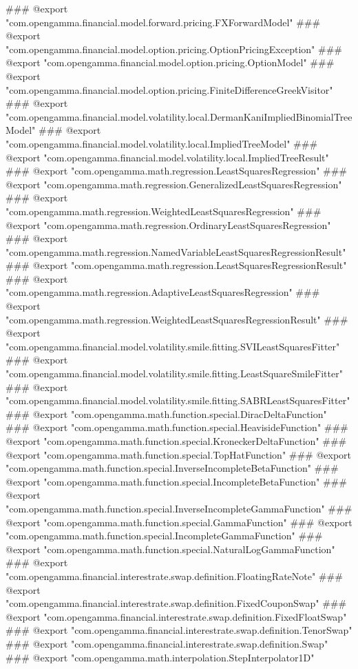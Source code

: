 ### @export "com.opengamma.financial.model.forward.pricing.FXForwardModel"
### @export "com.opengamma.financial.model.option.pricing.OptionPricingException"
### @export "com.opengamma.financial.model.option.pricing.OptionModel"
### @export "com.opengamma.financial.model.option.pricing.FiniteDifferenceGreekVisitor"
### @export "com.opengamma.financial.model.volatility.local.DermanKaniImpliedBinomialTreeModel"
### @export "com.opengamma.financial.model.volatility.local.ImpliedTreeModel"
### @export "com.opengamma.financial.model.volatility.local.ImpliedTreeResult"
### @export "com.opengamma.math.regression.LeastSquaresRegression"
### @export "com.opengamma.math.regression.GeneralizedLeastSquaresRegression"
### @export "com.opengamma.math.regression.WeightedLeastSquaresRegression"
### @export "com.opengamma.math.regression.OrdinaryLeastSquaresRegression"
### @export "com.opengamma.math.regression.NamedVariableLeastSquaresRegressionResult"
### @export "com.opengamma.math.regression.LeastSquaresRegressionResult"
### @export "com.opengamma.math.regression.AdaptiveLeastSquaresRegression"
### @export "com.opengamma.math.regression.WeightedLeastSquaresRegressionResult"
### @export "com.opengamma.financial.model.volatility.smile.fitting.SVILeastSquaresFitter"
### @export "com.opengamma.financial.model.volatility.smile.fitting.LeastSquareSmileFitter"
### @export "com.opengamma.financial.model.volatility.smile.fitting.SABRLeastSquaresFitter"
### @export "com.opengamma.math.function.special.DiracDeltaFunction"
### @export "com.opengamma.math.function.special.HeavisideFunction"
### @export "com.opengamma.math.function.special.KroneckerDeltaFunction"
### @export "com.opengamma.math.function.special.TopHatFunction"
### @export "com.opengamma.math.function.special.InverseIncompleteBetaFunction"
### @export "com.opengamma.math.function.special.IncompleteBetaFunction"
### @export "com.opengamma.math.function.special.InverseIncompleteGammaFunction"
### @export "com.opengamma.math.function.special.GammaFunction"
### @export "com.opengamma.math.function.special.IncompleteGammaFunction"
### @export "com.opengamma.math.function.special.NaturalLogGammaFunction"
### @export "com.opengamma.financial.interestrate.swap.definition.FloatingRateNote"
### @export "com.opengamma.financial.interestrate.swap.definition.FixedCouponSwap"
### @export "com.opengamma.financial.interestrate.swap.definition.FixedFloatSwap"
### @export "com.opengamma.financial.interestrate.swap.definition.TenorSwap"
### @export "com.opengamma.financial.interestrate.swap.definition.Swap"
### @export "com.opengamma.math.interpolation.StepInterpolator1D"
